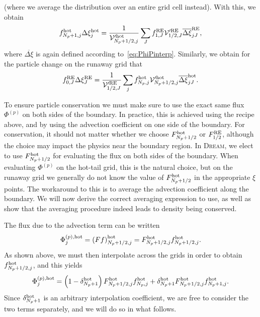 \documentclass{notes}
\newcommand{\DREAM}{\textsc{Dream}}
\newcommand{\Vp}{\mathcal{V}'}
\begin{document}
    (where we average the distribution over an entire grid cell instead).
    With this, we obtain
    \begin{equation}\label{eq:fhotTransf}
        f^{\rm hot}_{N_p+1,j}\Delta\xi_j^{\rm hot} =
            \frac{1}{\Vp^{\rm hot}_{N_p+1/2,j}} \sum_J
                f_{1,J}^{\rm RE} \Vp^{\rm RE}_{1/2,J} \overline{\Delta\xi}_{jJ}^{\rm RE},
    \end{equation}
    where $\overline{\Delta\xi}$ is again defined according
    to~\eqref{eq:PhiPinterp}. Similarly, we obtain for the particle change on
    the runaway grid that
    \begin{equation}\label{eq:crossFlux_fRE0}
        f^{\rm RE}_{0,J}\Delta\xi_J^{\rm RE} =
            \frac{1}{\Vp^{\rm RE}_{1/2,J}} \sum_j
                f_{N_p,j}^{\rm hot} \Vp^{\rm hot}_{N_p+1/2,j} \overline{\Delta\xi}_{jJ}^{\rm hot}.
    \end{equation}

    To ensure particle conservation we must make sure to use the exact same flux
    $\Phi^{(p)}$ on both sides of the boundary. In practice, this is achieved
    using the recipe above, and by using the advection coefficient on one side
    of the boundary. For conservation, it should not matter whether we choose
    $F_{N_p+1/2}^{\rm hot}$ or $F_{1/2}^{\rm RE}$, although the choice may
    impact the physics near the boundary region. In \DREAM, we elect to use
    $F_{N_p+1/2}^{\rm hot}$ for evaluating the flux on both sides of the
    boundary. When evaluating $\Phi^{(p)}$ on the hot-tail grid, this is the
    natural choice, but on the runaway grid we generally do not know the value
    of $F^{\rm hot}_{N_p+1/2}$ in the appropriate $\xi$ points. The workaround
    to this is to average the advection coefficient along the boundary. We will
    now derive the correct averaging expression to use, as well as show that
    the averaging procedure indeed leads to density being conserved.

    The flux due to the advection term can be written
    \begin{equation}
        \Phi_j^{(p),{\rm hot}} = \left( Ff \right)^{\rm hot}_{N_p+1/2,j} = F_{N_p+1/2,j}^{\rm hot} f^{\rm hot}_{N_p+1/2,j}.
    \end{equation}
    As shown above, we must then interpolate across the grids in order to obtain
    $f^{\rm hot}_{N_p+1/2,j}$, and this yields
    \begin{equation}\label{eq:PhiPhot}
        \Phi^{(p),{\rm hot}}_j =
            \left(1-\delta^{\rm hot}_{N_p+1}\right) F^{\rm hot}_{N_p+1/2,j} f_{N_p,j}^{\rm hot} +
            \delta^{\rm hot}_{N_p+1} F^{\rm hot}_{N_p+1/2,j} f_{N_p+1,j}^{\rm hot}.
    \end{equation}
    Since $\delta^{\rm hot}_{N_p+1}$ is an arbitrary interpolation coefficient,
    we are free to consider the two terms separately, and we will do so in what
    follows.
\end{document}
